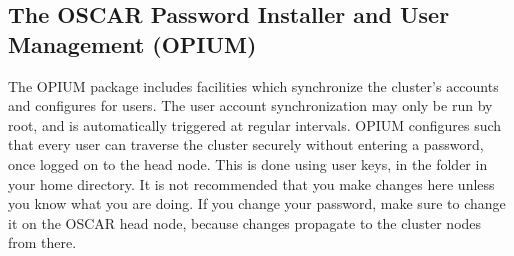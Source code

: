 %
%
% 
% 
% 
% 
%

\subsection{The OSCAR Password Installer and User Management (OPIUM)}
\label{app:opium-overview}

The OPIUM package includes facilities which synchronize the cluster's
accounts and configures  for users.  The user account
synchronization may only be run by root, and is automatically
triggered at regular intervals.
OPIUM configures  such that every user can traverse the
cluster securely without entering a password, once logged on to the
head node.  This is done using  user keys, in the 
folder in your home directory.  It is not recommended that you make
changes here unless you know what you are doing.
If you change your password, make sure to change it on the OSCAR head node,
because changes propagate to the cluster nodes from there.

